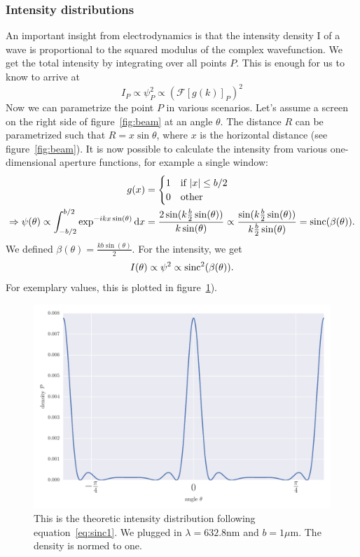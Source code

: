 \subsubsection{Intensity distributions}
An important insight from electrodynamics is that the intensity density I of a
wave is proportional to the squared modulus of the complex wavefunction. We get the total intensity by
integrating over all points $P$.
This is enough for us to know to arrive at
\begin{equation}
    I_P \propto \psi_P^2 \propto \left ( \mathcal{F} \left[g(k)\right ]_P \right )^2 
\end{equation}
Now we can parametrize the point $P$ in various scenarios. Let's assume a screen on the right side of
figure~\ref{fig:beam} at an angle $\theta$. The distance $R$ can be parametrized such that
$R = x \sin \theta $, where $x$ is the horizontal distance (see figure~\ref{fig:beam}).
It is now possible to calculate the intensity from various one-dimensional aperture
functions, for example a single window:
\begin{align}
    \label{eq:g1}
    g(x) &= 
    \begin{cases}
        1 & \text{if } |x| \leq b/2 \\ 
        0 & \text{other }
    \end{cases} \\
    \Rightarrow \psi(\theta) \propto
    \int_{-b/2}^{b/2} \exp ^{-i k x \sin(\theta)} \mathrm{d} x
    &= \frac{2\sin ( k \frac{b}{2} \sin ( \theta ))}{k \sin(\theta)} \propto
    \frac{\sin ( k \frac{b}{2} \sin ( \theta ))}{k \frac{b}{2}  \sin(\theta)} 
    = \mathrm{sinc}(\beta(\theta)).
\end{align}
We defined $\beta(\theta) = \frac{kb \sin(\theta)}{2}$.
For the intensity, we get
\begin{equation}
    \label{eq:sinc1}
    I(\theta) \propto \psi^2 \propto \mathrm{sinc}^2(\beta(\theta)).
\end{equation}
For exemplary values, this is plotted in figure~\ref{fig:sinc1}).
\begin{figure}[htpb]
    \centering
    \includegraphics[width=0.8\linewidth]{figures/sinc1}
    \caption{This is the theoretic intensity distribution following equation~\eqref{eq:sinc1}. 
        We plugged in $\lambda = 632.8$nm and $b = 1 \mu$m. The density is normed to one.}
    \label{fig:sinc1}
\end{figure}

